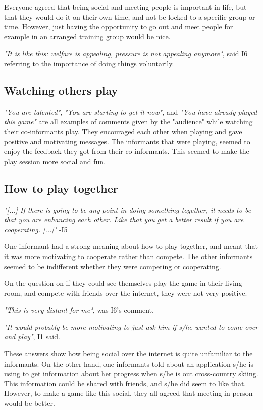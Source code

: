 Everyone agreed that being social and meeting people is important in life, but that they would do it on their own time, and not be locked to a specific group or time. However, just having the opportunity to go out and meet people for example in an arranged training group would be nice. 

\emph{"It is like this: welfare is appealing, pressure is not appealing anymore"}, said I6 referring to the importance of doing things voluntarily. 

\subsection{Watching others play}
\emph{"You are talented"}, \emph{"You are starting to get it now"}, and \emph{"You have already played this game"} are all examples of comments given by the "audience" while watching their co-informants play. They encouraged each other when playing and gave positive and motivating messages. The informants that were playing, seemed to enjoy the feedback they got from their co-informants. This seemed to make the play session more social and fun.  

\subsection{How to play together}
\emph{"[...] If there is going to be any point in doing something together, it needs to be that you are enhancing each other. Like that you get a better result if you are cooperating. [...]"} -I5

One informant had a strong meaning about how to play together, and meant that it was more motivating to cooperate rather than compete. The other informants seemed to be indifferent whether they were competing or cooperating.

On the question on if they could see themselves play the game in their living room, and compete with friends over the internet, they were not very positive.

\emph{"This is very distant for me"}, was I6's comment.

\emph{"It would probably be more motivating to just ask him if s/he wanted to come over and play"}, I1 said.

These answers show how being social over the internet is quite unfamiliar to the informants. On the other hand, one informants told about an application s/he is using to get information about her progress when s/he is out cross-country skiing. This information could be shared with friends, and s/he did seem to like that. However, to make a game like this social, they all agreed that meeting in person would be better.

